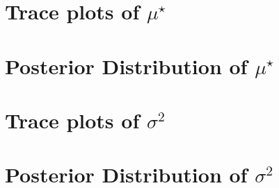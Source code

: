 \documentclass[10pt]{article} %
\begin{document}
\newpage
\section{Trace plots of $\mu^\star$}
\begin{figure}[H]
  \begin{center}  %
  \end{center}
  \label{fig:mustrace}
  \caption{}
\end{figure}

\newpage
\section{Posterior Distribution of $\mu^\star$}
\begin{figure}[H]
  \begin{center}  %
  \end{center}
  \label{fig:mus}
  \caption{}
\end{figure}

\newpage
\section{Trace plots of $\sigma^2$}
\begin{figure}[H]
  \begin{center}  %
  \end{center}
  \label{fig:sig2trace}
  \caption{}
\end{figure}

\newpage
\section{Posterior Distribution of $\sigma^2$}
\begin{figure}[H]
  \begin{center}  %
  \end{center}
  \label{fig:sig2}
  \caption{}
\end{figure}



\newpage
\end{document}
